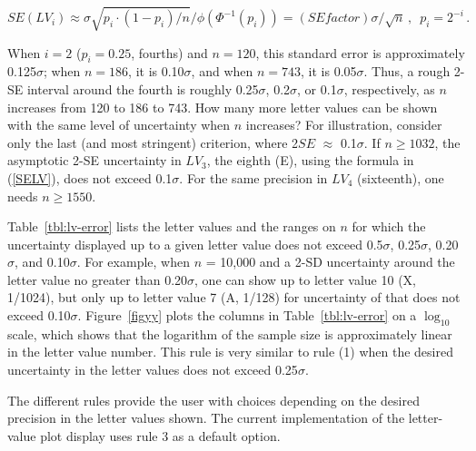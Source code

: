 \documentclass[oneside]{article}
\begin{document}
\begin{equation}
SE(LV_i) \approx \sigma \sqrt{p_i \cdot (1 - p_i)/ n} / \phi(\Phi^{-1}(p_i)) 
 = (SEfactor) \sigma / \sqrt{n} \, ,
 \, \, \, p_i = 2^{-i} \, .
\label{SELV}
\end{equation}

\noindent When $i = 2$ ($p_i = 0.25$, fourths) and $n = 120$, this standard error is approximately 0.125$\sigma$; when $n = 186$, it is 0.10$\sigma$, and when $n = 743$, it is 0.05$\sigma$. Thus, a rough 2-SE interval around the fourth is roughly 0.25$\sigma$, 0.2$\sigma$, or 0.1$\sigma$, respectively, as $n$ increases from 120 to 186 to 743. How many more letter values can be shown with the same level of uncertainty when $n$ increases? For illustration, consider only the last (and most stringent) criterion, where 2$SE$ $\approx$ 0.1$\sigma$. If $n \geq 1032$, the asymptotic 2-SE uncertainty in $LV_3$, the eighth (E), using the formula in (\ref{SELV}), does not exceed 0.1$\sigma$. For the same precision in $LV_4$ (sixteenth), one needs $n \geq 1550$.

Table~\ref{tbl:lv-error} lists the letter values and the ranges on $n$ for which the uncertainty displayed up to a given letter value does not exceed 0.5$\sigma$, 0.25$\sigma$, 0.20$\sigma$, and 0.10$\sigma$. For example, when $n$ = 10,000 and a 2-SD uncertainty around the letter value no greater than 0.20$\sigma$, one can show up to letter value 10 (X, 1/1024), but only up to letter value 7 (A, 1/128) for uncertainty of that does not exceed 0.10$\sigma$. Figure~\ref{figyy} plots the columns in Table~\ref{tbl:lv-error} on a $\log_10$ scale, which shows that the logarithm of the sample size is approximately linear in the letter value number. This rule is very similar to rule (1) when the desired uncertainty in the letter values does not exceed 0.25$\sigma$.

The different rules provide the user with choices depending on the desired precision in the letter values shown. The current implementation of the letter-value plot display uses rule 3 as a default option.
\end{document}
